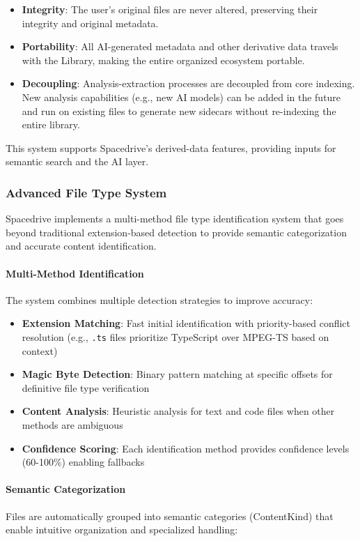 \documentclass[sigconf]{acmart}
\begin{document}
\begin{itemize}[noitemsep, topsep=0pt]
    \item \textbf{Integrity}: The user's original files are never altered, preserving their integrity and original metadata.
    \item \textbf{Portability}: All AI-generated metadata and other derivative data travels with the Library, making the entire organized ecosystem portable.
    \item \textbf{Decoupling}: Analysis-extraction processes are decoupled from core indexing. New analysis capabilities (e.g., new AI models) can be added in the future and run on existing files to generate new sidecars without re-indexing the entire library.
\end{itemize}

This system supports Spacedrive's derived-data features, providing inputs for semantic search and the AI layer.

\subsubsection{Advanced File Type System}

Spacedrive implements a multi-method file type identification system that goes beyond traditional extension-based detection to provide semantic categorization and accurate content identification.

\paragraph{Multi-Method Identification}
The system combines multiple detection strategies to improve accuracy:
\begin{itemize}
    \item \textbf{Extension Matching}: Fast initial identification with priority-based conflict resolution (e.g., \texttt{.ts} files prioritize TypeScript over MPEG-TS based on context)
    \item \textbf{Magic Byte Detection}: Binary pattern matching at specific offsets for definitive file type verification
    \item \textbf{Content Analysis}: Heuristic analysis for text and code files when other methods are ambiguous
    \item \textbf{Confidence Scoring}: Each identification method provides confidence levels (60-100\%) enabling fallbacks
\end{itemize}

\paragraph{Semantic Categorization}
Files are automatically grouped into semantic categories (ContentKind) that enable intuitive organization and specialized handling:
\end{document}

